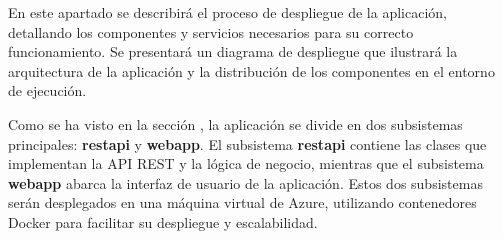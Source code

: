 En este apartado se describirá el proceso de despliegue de la aplicación, detallando los componentes y servicios necesarios para su correcto funcionamiento. 
Se presentará un diagrama de despliegue que ilustrará la arquitectura de la aplicación y la distribución de los componentes en el entorno de ejecución. 

Como se ha visto en la sección , la aplicación se divide en dos subsistemas principales: \textbf{restapi} y \textbf{webapp}.
El subsistema \textbf{restapi} contiene las clases que implementan la API REST y la lógica de negocio, mientras que el subsistema \textbf{webapp} abarca la interfaz de usuario de la aplicación.
Estos dos subsistemas serán desplegados en una máquina virtual de Azure, utilizando contenedores Docker para facilitar su despliegue y escalabilidad.

